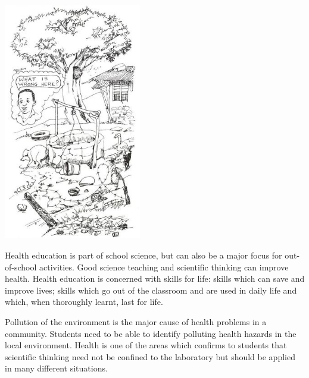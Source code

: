 \begin{multicols}{2}
\begin{center}
\includegraphics[width=0.45\textwidth]{./img/source/science-health.jpg}
\end{center}

Health education is part of school science,
but can also be a major focus for out-of-school
activities. Good science teaching and scientific
thinking can improve health. Health education
is concerned with skills for life: skills which can
save and improve lives; skills which go out of
the classroom and are used in daily life and
which, when thoroughly learnt, last for life.

Pollution of the environment is the major cause
of health problems in a community. Students
need to be able to identify polluting health
hazards in the local environment. Health is one
of the areas which confirms to students that
scientific thinking need not be confined to the
laboratory but should be applied in many
different situations.


\end{multicols}